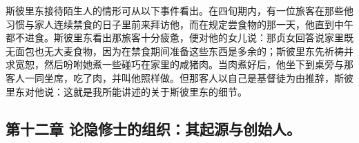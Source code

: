 斯彼里东接待陌生人的情形可从以下事件看出。在四旬期内，有一位旅客在那些他习惯与家人连续禁食的日子里前来拜访他，而在规定尝食物的那一天，他直到中午都不进食。斯彼里东看出那旅客十分疲惫，便对他的女儿说：那贞女回答说家里既无面包也无大麦食物，因为在禁食期间准备这些东西是多余的；斯彼里东先祈祷并求宽恕，然后吩咐她煮一些碰巧在家里的咸猪肉。当肉煮好后，他坐下到桌旁与那客人一同坐席，吃了肉，并叫他照样做。但那客人以自己是基督徒为由推辞，斯彼里东对他说：这就是我所能讲述的关于斯彼里东的细节。\par


\subsection{第十二章 论隐修士的组织：其起源与创始人。}

